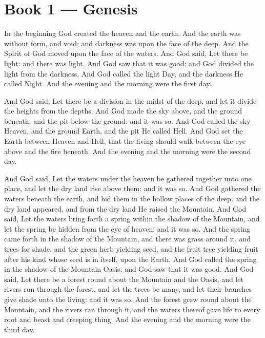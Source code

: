 
\section*{Book 1 --- Genesis}

In the beginning God created the heaven and the earth. And the earth was without form, and void; and darkness was upon the face of the deep. And the Spirit of God moved upon the face of the waters. And God said, Let there be light: and there was light. And God saw that it was good: and God divided the light from the darkness. And God called the light Day, and the darkness He called Night. And the evening and the morning were the first day.

And God said, Let there be a division in the midst of the deep, and let it divide the heights from the depths. And God made the sky above, and the ground beneath, and the pit below the ground: and it was so. And God called the sky Heaven, and the ground Earth, and the pit He called Hell. And God set the Earth between Heaven and Hell, that the living should walk between the eye above and the fire beneath. And the evening and the morning were the second day.

And God said, Let the waters under the heaven be gathered together unto one place, and let the dry land rise above them: and it was so. And God gathered the waters beneath the earth, and hid them in the hollow places of the deep; and the dry land appeared, and from the dry land He raised the Mountain. And God said, Let the waters bring forth a spring within the shadow of the Mountain, and let the spring be hidden from the eye of heaven: and it was so. And the spring came forth in the shadow of the Mountain, and there was grass around it, and trees for shade, and the green herb yielding seed, and the fruit tree yielding fruit after his kind whose seed is in itself, upon the Earth. And God called the spring in the shadow of the Mountain Oasis: and God saw that it was good. And God said, Let there be a forest round about the Mountain and the Oasis, and let rivers run through the forest, and let the trees be many, and let their branches give shade unto the living: and it was so. And the forest grew round about the Mountain, and the rivers ran through it, and the waters thereof gave life to every root and beast and creeping thing. And the evening and the morning were the third day.

